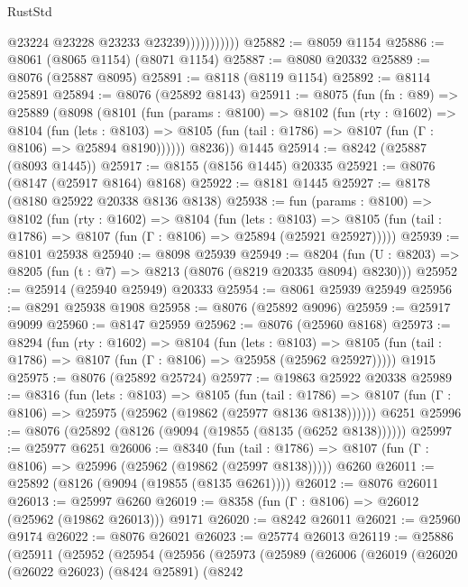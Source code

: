 \begin{lexlean}{RustStd}
\begin{coremodule}
                          @23224
                          @23228
                          @23233
                          @23239)))))))))))
@25882 := @8059 @1154
@25886 := @8061 (@8065 @1154) (@8071 @1154)
@25887 := @8080 @20332
@25889 := @8076 (@25887 @8095)
@25891 := @8118 (@8119 @1154)
@25892 := @8114 @25891
@25894 := @8076 (@25892 @8143)
@25911 := @8075
    (fun (fn : @89) =>
    @25889
      (@8098
        (@8101
          (fun (params : @8100) =>
          @8102
            (fun (rty : @1602) =>
            @8104
              (fun (lets : @8103) =>
              @8105 (fun (tail : @1786) => @8107 (fun (Γ : @8106) => @25894 @8190))))))
        @8236))
    @1445
@25914 := @8242 (@25887 (@8093 @1445))
@25917 := @8155 (@8156 @1445) @20335
@25921 := @8076 (@8147 (@25917 @8164) @8168)
@25922 := @8181 @1445
@25927 := @8178 (@8180 @25922 @20338 @8136 @8138)
@25938 := fun (params : @8100) =>
  @8102
    (fun (rty : @1602) =>
    @8104
      (fun (lets : @8103) =>
      @8105 (fun (tail : @1786) => @8107 (fun (Γ : @8106) => @25894 (@25921 @25927)))))
@25939 := @8101 @25938
@25940 := @8098 @25939
@25949 := @8204
    (fun (U : @8203) => @8205 (fun (t : @7) => @8213 (@8076 (@8219 @20335 @8094) @8230)))
@25952 := @25914 (@25940 @25949) @20333
@25954 := @8061 @25939 @25949
@25956 := @8291 @25938 @1908
@25958 := @8076 (@25892 @9096)
@25959 := @25917 @9099
@25960 := @8147 @25959
@25962 := @8076 (@25960 @8168)
@25973 := @8294
    (fun (rty : @1602) =>
    @8104
      (fun (lets : @8103) =>
      @8105 (fun (tail : @1786) => @8107 (fun (Γ : @8106) => @25958 (@25962 @25927)))))
    @1915
@25975 := @8076 (@25892 @25724)
@25977 := @19863 @25922 @20338
@25989 := @8316
    (fun (lets : @8103) =>
    @8105
      (fun (tail : @1786) =>
      @8107 (fun (Γ : @8106) => @25975 (@25962 (@19862 (@25977 @8136 @8138))))))
    @6251
@25996 := @8076 (@25892 (@8126 (@9094 (@19855 (@8135 (@6252 @8138))))))
@25997 := @25977 @6251
@26006 := @8340
    (fun (tail : @1786) => @8107 (fun (Γ : @8106) => @25996 (@25962 (@19862 (@25997 @8138)))))
    @6260
@26011 := @25892 (@8126 (@9094 (@19855 (@8135 @6261))))
@26012 := @8076 @26011
@26013 := @25997 @6260
@26019 := @8358 (fun (Γ : @8106) => @26012 (@25962 (@19862 @26013))) @9171
@26020 := @8242 @26011
@26021 := @25960 @9174
@26022 := @8076 @26021
@26023 := @25774 @26013
@26119 := @25886
    (@25911
      (@25952
        (@25954
          (@25956
            (@25973
              (@25989
                (@26006
                  (@26019
                    (@26020
                      (@26022 @26023)
                      (@8424 @25891)
                      (@8242

\end{coremodule}
\end{lexlean}
